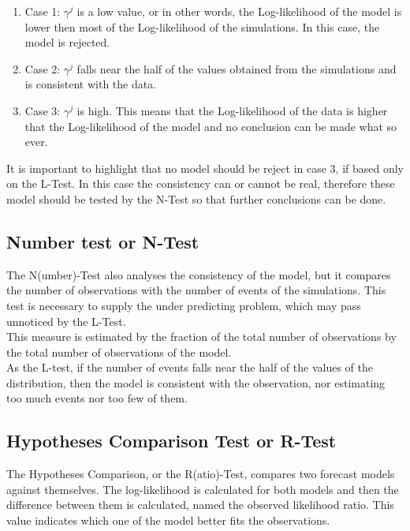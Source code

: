 \begin{enumerate}
\item Case 1: $\gamma^{j}$ is a low value, or in other words, the
  Log-likelihood of the model is lower then most of the Log-likelihood
  of the simulations. In this case, the model is rejected.
\item Case 2: $\gamma^{j}$ falls near the half of the values obtained
  from the simulations and is consistent with the data.
\item Case 3: $\gamma^{j}$ is high. This means that the Log-likelihood
  of the data is higher that the Log-likelihood of the model and no
  conclusion can be made what so ever.
\end{enumerate}


It is important to highlight that no model should be reject in case 3,
if based only on the L-Test. In this case the consistency can or
cannot be real, therefore these model should be tested by the N-Test
so that further conclusions can be done.\\

\subsection{Number test or N-Test}
The N(umber)-Test also analyses the consistency of the model, but it
compares the number of observations with the number of events of the
simulations. This test is necessary to supply the under predicting
problem, which may pass unnoticed by the L-Test.\\

This measure is estimated by the fraction of the total number of
observations by the total number of observations of the model.\\

As the L-test, if the number of events falls near the half of the
values of the distribution, then the model is consistent with the
observation, nor estimating too much events nor too few of them.\\

\subsection{Hypotheses Comparison Test or R-Test}

The Hypotheses Comparison, or the R(atio)-Test, compares two forecast
models against themselves. The log-likelihood is calculated for both
models and then the difference between them is calculated, named the
observed likelihood ratio. This value indicates which one of the model
better fits the observations.\\

